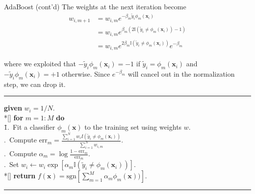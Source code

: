 \documentclass[10pt,mathserif]{beamer}
\begin{document}
\begin{frame}{AdaBoost (cont'd)}
The weights at the next iteration become
\begin{equation*}
    \begin{split}
        w_{i,m+1} & = w_{i,m}e^{-\beta_m \tilde{y}_i\phi_m(\bm{x}_i)}\\
        & = w_{i,m}e^{\beta_m(2\mathbb{I}(\tilde{y}_i\neq\phi_m(\bm{x}_i))-1)}\\
        & = w_{i,m}e^{2\beta_m\mathbb{I}(\tilde{y}_i\neq\phi_m(\bm{x}_i))}e^{-\beta_m}
    \end{split}
\end{equation*}
    
where we exploited that $-\tilde{y}_i\phi_m(\bm{x}_i) = -1$ if $\tilde{y}_i = \phi_m(\bm{x}_i)$ and $-\tilde{y}_i\phi_m(\bm{x}_i) = +1$ otherwise. Since $e^{-\beta_m}$ will cancel out in the normalization step, we can drop it. 

\noindent\rule[-5pt]{\textwidth}{0.4pt}
{\footnotesize
\begin{tabbing}
    {\bf given} $w_i= 1/N$. \\*[\smallskipamount]
    {\bf for} $m=1:M$ {\bf do}\\
    \qquad \= 1.\ Fit a classifier $\phi_m(\bm{x})$ to the training set using weights $w$. \\
    .\ Compute $\text{err}_m = \frac{\sum_{i=1}^N w_i I(\tilde{y}_i \neq \phi_m(\bm{x}_i))}{\sum_{i=1}^N w_{i,m}}$. \\
    .\ Compute $\alpha_m = \log\frac{1-\text{err}_m}{\text{err}_m}$. \\
    .\ Set $w_i\leftarrow w_i\exp\left[\alpha_m\mathbb{I}(\tilde{y}_i\neq\phi_m(\bm{x}_i))\right]$. \\*[\smallskipamount]
    {\bf return} $f(\bm{x})=\text{sgn}\left[\sum_{m=1}^M\alpha_m\phi_m(\bm{x}))\right]$.
\end{tabbing}}
\noindent\rule[10pt]{\textwidth}{0.4pt}
\end{frame}
\end{document}
